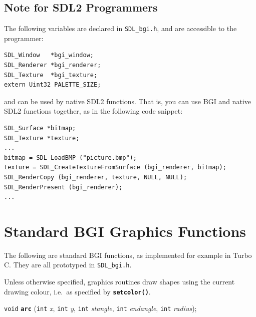 \documentclass[a4paper,12pt]{article}
\newcommand{\V}{\texttt{void}}      %
\newcommand{\I}{\texttt{int}}       %
\newcommand{\func}[1]{\textbf{\texttt{#1}}}  %
\newcommand{\A}[1]{\emph{#1}}       %
\newcommand{\F}[1]{\texttt{#1}}     %
\newenvironment{bgi}
{ %
  \begin{snugshade}
}
{ %
  \end{snugshade}
}
\begin{document}

\subsection{Note for SDL2 Programmers}

The following variables are declared in \F{SDL\_bgi.h}, and are
accessible to the programmer:

\begin{small}
\begin{spacing}{0.85}
\begin{verbatim}
SDL_Window   *bgi_window;
SDL_Renderer *bgi_renderer;
SDL_Texture  *bgi_texture;
extern Uint32 PALETTE_SIZE;
\end{verbatim}
\end{spacing}
\end{small}

and can be used by native SDL2 functions. That is, you can use BGI and
native SDL2 functions together, as in the following code snippet:

\begin{small}
\begin{spacing}{0.85}
\begin{verbatim}
SDL_Surface *bitmap;
SDL_Texture *texture;
...
bitmap = SDL_LoadBMP ("picture.bmp");
texture = SDL_CreateTextureFromSurface (bgi_renderer, bitmap);
SDL_RenderCopy (bgi_renderer, texture, NULL, NULL);
SDL_RenderPresent (bgi_renderer);
...
\end{verbatim}
\end{spacing}
\end{small}


\section{Standard BGI Graphics Functions}

The following are standard BGI functions, as implemented for example
in Turbo C. They are all prototyped in \F{SDL\_bgi.h}.

Unless otherwise specified, graphics routines draw shapes using the
current drawing colour, i.e.\ as specified by \func{setcolor()}.


\label{sec:arc}

\begin{bgi}
  \V{} \func{arc} (\I{} \A{x}, \I{} \A{y}, \I{} \A{stangle}, \I{}
  \A{endangle}, \I{} \A{radius});
\end{bgi}
\end{document}
